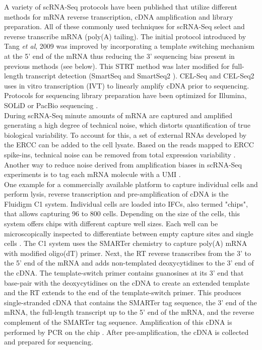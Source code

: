 A variety of scRNA-Seq protocols have been published that utilize different methods for mRNA reverse transcription, cDNA amplification and library preparation. All of these commonly used techniques for scRNA-Seq select and reverse transcribe mRNA (poly(A) tailing). The initial protocol introduced by Tang \textit{et al}, 2009 \citep{Tang2009} was improved by incorporating a template switching mechanism at the 5' end of the mRNA thus reducing the 3' sequencing bias present in previous methods \citep{Islam2011} (see below). This \gls{STRT} method was later modified for full-length transcript detection (SmartSeq \citep{Ramskold2012} and SmartSeq2 \citep{Picelli2013}). CEL-Seq \citep{Hashimshony2012} and CEL-Seq2 \citep{Hashimshony2016} uses in vitro transcription (IVT) to linearly amplify cDNA prior to sequencing. Protocols for sequencing library preparation have been optimized for Illumina, SOLiD or PacBio sequencing \citep{Kolodziejczyk2015review}. \\

During scRNA-Seq minute amounts of mRNA are captured and amplified generating a high degree of technical noise, which distorts quantification of true biological variability. To account for this, a set of external RNAs developed by the \gls{ERCC} \citep{Rna2005} can be added to the cell lysate. Based on the reads mapped to ERCC spike-ins, technical noise can be removed from total expression variability \citep{Brennecke2013, Vallejos2015BASiCS}. Another way to reduce noise derived from amplification biases in scRNA-Seq experiments is to tag each mRNA molecule with a \gls{UMI} \citep{Kivioja2011, Islam2014}.\\

One example for a commercially available platform to capture individual cells and perform lysis, reverse transcription and pre-amplification of cDNA is the Fluidigm\textsuperscript{\textregistered{}} C1 system. Individual cells are loaded into \glspl{IFC}, also termed "chips", that allows capturing 96 to 800 cells. Depending on the size of the cells, this system offers chips with different capture well sizes. Each well can be microscopically inspected to differentiate between empty capture sites and single cells \citep{Kolodziejczyk2015review}. The C1 system uses the SMARTer\textsuperscript{\textregistered{}} chemistry to capture poly(A) mRNA with modified oligo(dT) primer. Next, the \gls{RT} reverse transcribes from the 3' to the 5' end of the mRNA and adds non-templated deoxycytidines to the 3' end of the cDNA. The template-switch primer contains guanosines at its 3' end that base-pair with the deoxycytidines on the cDNA to create an extended template and the RT extends to the end of the template-switch primer. This produces single-stranded cDNA that contains the SMARTer tag sequence, the 3' end of the mRNA, the full-length transcript up to the 5' end of the mRNA, and the reverse complement of the SMARTer tag sequence. Amplification of this cDNA is performed by PCR on the chip \cite{Fluidigm2015}. After pre-amplification, the cDNA is collected and prepared for sequencing.\\

